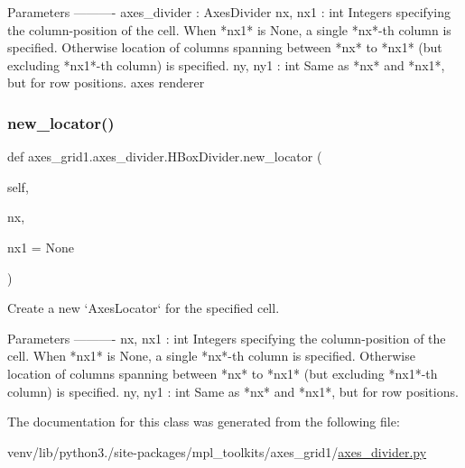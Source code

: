 \begin{DoxyVerb}Parameters
----------
axes_divider : AxesDivider
nx, nx1 : int
    Integers specifying the column-position of the
    cell. When *nx1* is None, a single *nx*-th column is
    specified. Otherwise location of columns spanning between *nx*
    to *nx1* (but excluding *nx1*-th column) is specified.
ny, ny1 : int
    Same as *nx* and *nx1*, but for row positions.
axes
renderer
\end{DoxyVerb}
 \mbox{\label{classaxes__grid1_1_1axes__divider_1_1HBoxDivider_ae4329d234322f7fa23ff725c4035cc21}} 
\subsubsection{\texorpdfstring{new\+\_\+locator()}{new\_locator()}}
{\footnotesize\ttfamily def axes\+\_\+grid1.\+axes\+\_\+divider.\+H\+Box\+Divider.\+new\+\_\+locator (\begin{DoxyParamCaption}\item[{}]{self,  }\item[{}]{nx,  }\item[{}]{nx1 = {\ttfamily None} }\end{DoxyParamCaption})}

\begin{DoxyVerb}Create a new `AxesLocator` for the specified cell.

Parameters
----------
nx, nx1 : int
    Integers specifying the column-position of the
    cell. When *nx1* is None, a single *nx*-th column is
    specified. Otherwise location of columns spanning between *nx*
    to *nx1* (but excluding *nx1*-th column) is specified.
ny, ny1 : int
    Same as *nx* and *nx1*, but for row positions.
\end{DoxyVerb}
 

The documentation for this class was generated from the following file\+:\begin{DoxyCompactItemize}
\item 
venv/lib/python3./site-\/packages/mpl\+\_\+toolkits/axes\+\_\+grid1/\hyperlink{axes__grid1_2axes__divider_8py}{axes\+\_\+divider.\+py}\end{DoxyCompactItemize}
